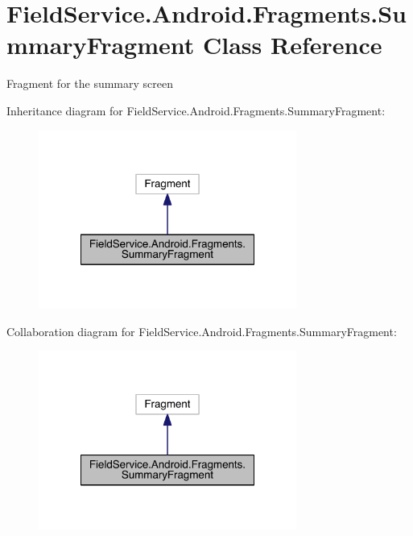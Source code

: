 \hypertarget{class_field_service_1_1_android_1_1_fragments_1_1_summary_fragment}{\section{Field\+Service.\+Android.\+Fragments.\+Summary\+Fragment Class Reference}
\label{class_field_service_1_1_android_1_1_fragments_1_1_summary_fragment}
}


Fragment for the summary screen  




Inheritance diagram for Field\+Service.\+Android.\+Fragments.\+Summary\+Fragment\+:
\nopagebreak
\begin{figure}[H]
\begin{center}
\leavevmode
\includegraphics[width=240pt]{class_field_service_1_1_android_1_1_fragments_1_1_summary_fragment__inherit__graph}
\end{center}
\end{figure}


Collaboration diagram for Field\+Service.\+Android.\+Fragments.\+Summary\+Fragment\+:
\nopagebreak
\begin{figure}[H]
\begin{center}
\leavevmode
\includegraphics[width=240pt]{class_field_service_1_1_android_1_1_fragments_1_1_summary_fragment__coll__graph}
\end{center}
\end{figure}
